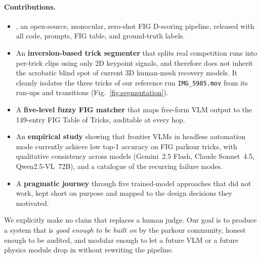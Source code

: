 \paragraph{Contributions.}
\begin{itemize}
  \setlength\itemsep{-2pt}
  \item \textbf{\sys{}}, an open-source, monocular, zero-shot FIG
        D-scoring pipeline, released with all code, prompts, FIG
        table, and ground-truth labels.
  \item An \textbf{inversion-based trick segmenter} that splits real
        competition runs into per-trick clips using only 2D keypoint
        signals, and therefore does not inherit the acrobatic blind
        spot of current 3D human-mesh recovery models. It cleanly
        isolates the three tricks of our reference run
        \texttt{IMG\_5985.mov} from its run-ups and transitions
        (Fig.~\ref{fig:segmentation}).
  \item A \textbf{five-level fuzzy FIG matcher} that maps free-form
        VLM output to the 149-entry FIG Table of Tricks, auditable
        at every hop.
  \item An \textbf{empirical study} showing that frontier VLMs in
        headless automation mode currently achieve low top-1 accuracy
        on FIG parkour tricks, with qualitative consistency across
        models (Gemini~2.5 Flash, Claude Sonnet~4.5, Qwen2.5-VL~72B),
        and a catalogue of the recurring failure modes.
  \item A \textbf{pragmatic journey} through five trained-model
        approaches that did not work, kept short on purpose and
        mapped to the design decisions they motivated.
\end{itemize}

We explicitly make no claim that \sys{} replaces a human judge. Our
goal is to produce a system that is \emph{good enough to be built on}
by the parkour community, honest enough to be audited, and modular
enough to let a future VLM or a future physics module drop in without
rewriting the pipeline.
